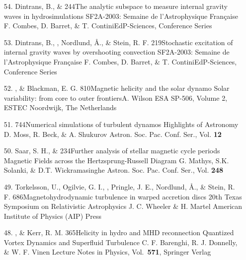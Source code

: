 \begin{itemize}
\item[54.]
Dintrans, B., \& \Brandenburg{}
{244}{The analytic subspace to measure internal gravity waves in hydrosimulations}
{SF2A-2003: Semaine de l'Astrophysique Fran{\c c}aise}
{F. Combes, D. Barret, \& T. Contini}{EdP-Sciences, Conference Series}

\item[53.]
Dintrans, B., \Brandenburg, Nordlund, \AA., \& Stein, R. F.
{219}{Stochastic excitation of internal gravity waves by overshooting convection}
{SF2A-2003: Semaine de l'Astrophysique Fran{\c c}aise}
{F. Combes, D. Barret, \& T. Contini}{EdP-Sciences, Conference Series}

\item[52.]
\Brandenburg, \& Blackman, E. G.
{810}{Magnetic helicity and the solar dynamo}
{Solar variability: from core to outer frontiers}{A. Wilson}
{ESA SP-506, Volume 2, ESTEC Noordwijk, The Netherlands}

\item[51.]
\Brandenburg{}
{744}{Numerical simulations of turbulent dynamos}
{Highlights of Astronomy}
{D. Moss, R. Beck, \& A. Shukurov}
{Astron. Soc. Pac. Conf. Ser., Vol. {\bf 12}}

\item[50.]
Saar, S. H., \& \Brandenburg{}
{234}{Further analysis of stellar magnetic cycle periods}
{Magnetic Fields across the Hertzsprung-Russell Diagram}
{G. Mathys, S.K. Solanki, \& D.T. Wickramasinghe}
{Astron. Soc. Pac. Conf. Ser., Vol. {\bf 248}}

\item[49.]
Torkelsson, U., Ogilvie, G. I., \Brandenburg, Pringle, J. E.,
Nordlund, \AA., \& Stein, R. F.
{686}{Magnetohydrodynamic turbulence in warped accretion discs}
{20th Texas Symposium on Relativistic Astrophysics}
{J. C. Wheeler \& H. Martel}
{American Institute of Physics (AIP) Press}

\item[48.]
\Brandenburg, \& Kerr, R. M.
{365}{Helicity in hydro and MHD reconnection}
{Quantized Vortex Dynamics and Superfluid Turbulence}
{C. F. Barenghi, R. J. Donnelly, \& W. F. Vinen}
{Lecture Notes in Physics, Vol.\ {\bf571}, Springer Verlag}


\end{itemize}
